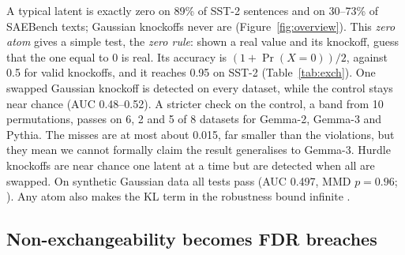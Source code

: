 A typical latent is exactly zero on 89\% of SST-2 sentences and on 30--73\% of SAEBench texts; Gaussian knockoffs never
are (Figure~\ref{fig:overview}). This \emph{zero atom} gives a simple test, the \emph{zero rule}: shown a real value and
its knockoff, guess that the one equal to 0 is real. Its accuracy is $(1 + \Pr(X=0))/2$, against 0.5 for valid knockoffs,
and it reaches 0.95 on SST-2 (Table~\ref{tab:exch}). One swapped Gaussian knockoff is detected on every dataset, while the
control stays near chance (AUC 0.48--0.52). A stricter check on the control, a band from 10 permutations, passes on
6, 2 and 5 of 8 datasets for Gemma-2, Gemma-3 and Pythia. The misses are at most about 0.015, far smaller than the
violations, but they mean we cannot formally claim the result generalises to Gemma-3. Hurdle knockoffs are near chance one latent at a time
but are detected when all are swapped. On synthetic Gaussian data all tests pass (AUC 0.497, MMD $p = 0.96$;
\citealp{gretton2012kernel}). Any atom also makes the KL term in the robustness bound infinite \citep{barber2020}.

\subsection{Non-exchangeability becomes FDR breaches}
\label{sec:breach}

\begin{table}[t]
\centering
\small
\setlength{\tabcolsep}{3pt}
\caption{Gaussian (block-MVR) knockoffs on planted labels, cross-validated penalty: cells or datasets
whose FDR exceeds the target after BY correction (SST-2 strong signals: $p = 512$, exact MVR). All
breaches are in interaction designs. The Gaussian control never breaches.}
\label{tab:breach}
\end{table}

